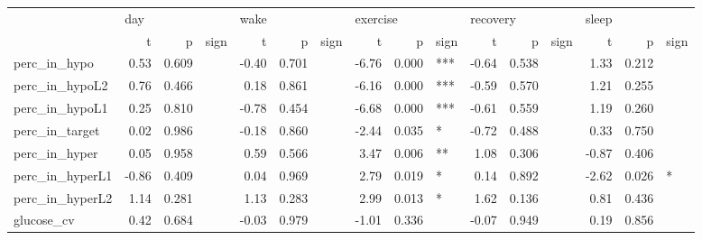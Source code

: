 \begin{tabular}{lrrlrrlrrlrrlrrl}
\toprule
{} & \multicolumn{3}{l}{day} & \multicolumn{3}{l}{wake} & \multicolumn{3}{l}{exercise} & \multicolumn{3}{l}{recovery} & \multicolumn{3}{l}{sleep} \\
{} &     t &      p & sign &     t &      p & sign &        t &      p & sign &        t &      p & sign &     t &      p & sign \\
\midrule
perc_in_hypo    &  0.53 &  0.609 &      & -0.40 &  0.701 &      &    -6.76 &  0.000 &  *** &    -0.64 &  0.538 &      &  1.33 &  0.212 &      \\
perc_in_hypoL2  &  0.76 &  0.466 &      &  0.18 &  0.861 &      &    -6.16 &  0.000 &  *** &    -0.59 &  0.570 &      &  1.21 &  0.255 &      \\
perc_in_hypoL1  &  0.25 &  0.810 &      & -0.78 &  0.454 &      &    -6.68 &  0.000 &  *** &    -0.61 &  0.559 &      &  1.19 &  0.260 &      \\
perc_in_target  &  0.02 &  0.986 &      & -0.18 &  0.860 &      &    -2.44 &  0.035 &    * &    -0.72 &  0.488 &      &  0.33 &  0.750 &      \\
perc_in_hyper   &  0.05 &  0.958 &      &  0.59 &  0.566 &      &     3.47 &  0.006 &   ** &     1.08 &  0.306 &      & -0.87 &  0.406 &      \\
perc_in_hyperL1 & -0.86 &  0.409 &      &  0.04 &  0.969 &      &     2.79 &  0.019 &    * &     0.14 &  0.892 &      & -2.62 &  0.026 &    * \\
perc_in_hyperL2 &  1.14 &  0.281 &      &  1.13 &  0.283 &      &     2.99 &  0.013 &    * &     1.62 &  0.136 &      &  0.81 &  0.436 &      \\
glucose_cv      &  0.42 &  0.684 &      & -0.03 &  0.979 &      &    -1.01 &  0.336 &      &    -0.07 &  0.949 &      &  0.19 &  0.856 &      \\
\bottomrule
\end{tabular}
